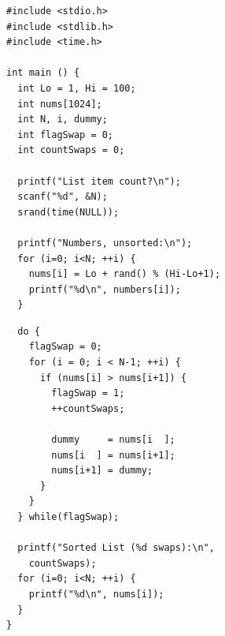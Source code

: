 \begin{frame}[fragile]%
%
%
\begin{codebox}
\begin{verbatim}
#include <stdio.h>
#include <stdlib.h>
#include <time.h>

int main () {
  int Lo = 1, Hi = 100;
  int nums[1024];
  int N, i, dummy;
  int flagSwap = 0;
  int countSwaps = 0;

  printf("List item count?\n");
  scanf("%d", &N);
  srand(time(NULL));
  
  printf("Numbers, unsorted:\n");
  for (i=0; i<N; ++i) {
    nums[i] = Lo + rand() % (Hi-Lo+1);
    printf("%d\n", numbers[i]);
  }
\end{verbatim}
\end{codebox}
%
\begin{codebox}[...Fortsetzung]
\begin{verbatim}
  do {
    flagSwap = 0;
    for (i = 0; i < N-1; ++i) {
      if (nums[i] > nums[i+1]) {
        flagSwap = 1;
        ++countSwaps;
	    
        dummy     = nums[i  ];
        nums[i  ] = nums[i+1];
        nums[i+1] = dummy;
      }
    }
  } while(flagSwap);

  printf("Sorted List (%d swaps):\n", 
    countSwaps);
  for (i=0; i<N; ++i) {
    printf("%d\n", nums[i]);
  }
}
\end{verbatim}
\end{codebox}
%
\end{frame}


